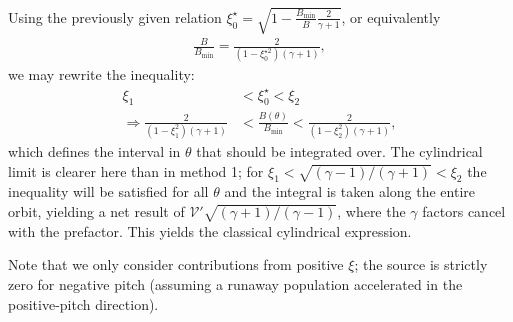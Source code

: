 \documentclass[11pt,a4paper]{article}
\newcommand{\rd}{\ensuremath{\mathrm{d}}}
\newcommand{\sub}[1]{\ensuremath{_{\text{#1}}}}
\begin{document}
Using the previously given relation $\xi_0^\star = \sqrt{ 1 - \frac{B\sub{min}}{B}\frac{2}{\gamma+1}}$, or equivalently
\begin{align}
\frac{B}{B\sub{min}} = \frac{2}{(1-\xi_0^{\star 2})(\gamma+1)},
\end{align}
 we may rewrite the inequality:
\begin{align}
\xi_1 &< \xi_0^\star < \xi_2 \\
\Rightarrow \frac{2}{(1-\xi_1^2)(\gamma+1)} &< \frac{B(\theta)}{B\sub{min}} < \frac{2}{(1-\xi_2^2)(\gamma+1)},
\end{align}
which defines the interval in $\theta$ that should be integrated over. The cylindrical limit is clearer here than in method 1; for $\xi_1 < \sqrt{(\gamma-1)/(\gamma+1)} < \xi_2$ the inequality will be satisfied for all $\theta$ and the integral is taken along the entire orbit, yielding a net result of $\mathcal{V'}\sqrt{(\gamma+1)/(\gamma-1)}$, where the $\gamma$ factors cancel with the prefactor. This yields the classical cylindrical expression.

Note that we only consider contributions from positive $\xi$; the source is strictly zero for negative pitch (assuming a runaway population accelerated in the positive-pitch direction).

\end{document}
